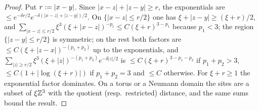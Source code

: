 \begin{proof}
Put $r:=|x-y|$. Since $|x-z|+|z-y|\ge r$, the exponentials are $\le e^{-\delta r/2}e^{-\delta(|x-z|+|z-y|)/2}$. On $\{|x-z|\le r/2\}$ one has $\xi+|z-y|\ge(\xi+r)/2$, and $\sum_{|x-z|\le r/2}\xi^3(\xi+|x-z|)^{-p_1}\le C(\xi+r)^{3-p_1}$ because $p_1<3$; the region $\{|z-y|\le r/2\}$ is symmetric; on the rest both factors are $\le C(\xi+|z-x|)^{-(p_1+p_2)}$ up to the exponentials, and $\sum_{|z|\ge r/2}\xi^3(\xi+|z|)^{-(p_1+p_2)}e^{-\delta|z|/2}$ is $\le C(\xi+r)^{3-p_1-p_2}$ if $p_1+p_2>3$, $\le C(1+|\log(\xi+r)|)$ if $p_1+p_2=3$ and $\le C$ otherwise. For $\xi+r\ge1$ the exponential factor dominates. On a torus or a Neumann domain the sites are a subset of $\xi\mathbb Z^3$ with the quotient (resp.\ restricted) distance, and the same sums bound the result.
\end{proof}

